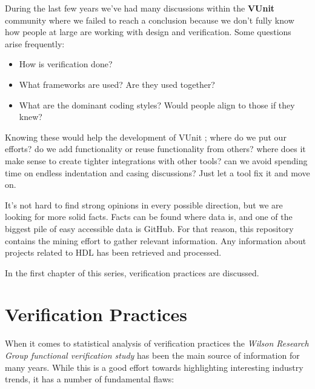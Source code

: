 \documentclass[]{article}
\providecommand{\tightlist}{%
  \setlength{\itemsep}{0pt}\setlength{\parskip}{0pt}}
\begin{document}
During the last few years we've had many discussions within the \textbf{VUnit} community where we failed to reach a conclusion because we don't fully know how people at large are working with design and verification. Some questions arise frequently:

\begin{itemize}
\tightlist
\item
  How is verification done?
\item
  What frameworks are used? Are they used together?
\item
  What are the dominant coding styles? Would people align to those if they knew?
\end{itemize}

Knowing these would help the development of VUnit \autocite{vunit}; where do we put our efforts? do we add functionality or reuse functionality from others? where does it make sense to create tighter integrations with other tools? can we avoid spending time on endless indentation and casing discussions? Just let a tool fix it and move on.

It's not hard to find strong opinions in every possible direction, but we are looking for more solid facts. Facts can be found where data is, and one of the biggest pile of easy accessible data is GitHub. For that reason, this repository contains the mining effort to gather relevant information. Any information about projects related to HDL has been retrieved and processed.

In the first chapter of this series, verification practices are discussed.

\hypertarget{verification-practices}{%
\section{Verification Practices}\label{verification-practices}}

When it comes to statistical analysis of verification practices the \emph{Wilson Research Group functional verification study} \autocite{wilson14} \autocite{wilson16} \autocite{wilson18} \autocite{wilson20} has been the main source of information for many years. While this is a good effort towards highlighting interesting industry trends, it has a number of fundamental flaws:
\end{document}
